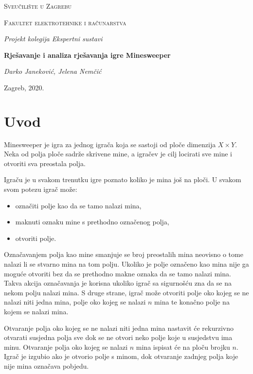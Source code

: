 \documentclass{article}
\numberwithin{figure}{section}
\numberwithin{table}{section}
\begin{document}
\begin{titlepage}
	\centering
	{\scshape\LARGE Sveučilište u Zagrebu\par}
	\vspace{0.5cm}
	{\scshape\Large Fakultet elektrotehnike i računarstva\par}
    \vfill
	{\Large\itshape Projekt kolegija Ekspertni sustavi \par}
	\vspace{0.5cm}
	{\huge\bfseries Rješavanje i analiza rješavanja igre Minesweeper\par}
	\vspace{0.5cm}
	{\Large\itshape Darko Janeković, Jelena Nemčić \par}
	\vfill
	{\large Zagreb, 2020.}
\end{titlepage}

\section{Uvod}

Minesweeper je igra za jednog igrača koja se sastoji od ploče dimenzija $X \times Y$. Neka od polja ploče sadrže skrivene mine, a igračev je cilj locirati sve mine i otvoriti sva preostala polja.

Igraču je u svakom trenutku igre poznato koliko je mina još na ploči. U svakom svom potezu igrač može:
\begin{itemize}
    \item označiti polje kao da se tamo nalazi mina,
    \item maknuti oznaku mine s prethodno označenog polja,
    \item otvoriti polje.
\end{itemize}

Označavanjem polja kao mine smanjuje se broj preostalih mina neovisno o tome nalazi li se stvarno mina na tom polju. Ukoliko je polje označeno kao mina nije ga moguće otvoriti bez da se prethodno makne oznaka da se tamo
nalazi mina. Takva akcija označavanja je korisna ukoliko igrač sa sigurnošću zna da se na nekom polju
nalazi mina. S druge strane, igrač može otvoriti polje oko kojeg se ne nalazi niti jedna
mina, polje oko kojeg se nalazi $n$ mina te konačno polje na kojem se nalazi mina.

Otvaranje polja oko kojeg se ne nalazi niti jedna mina nastavit će rekurzivno otvarati susjedna
polja sve dok se ne otvori neko polje koje u susjedstvu ima minu. Otvaranje polja oko kojeg
se nalazi $n$ mina ispisat će na ploču brojku $n$. Igrač je izgubio ako je otvorio polje s minom, dok otvaranje zadnjeg polja koje nije mina
označava pobjedu.
\end{document}
